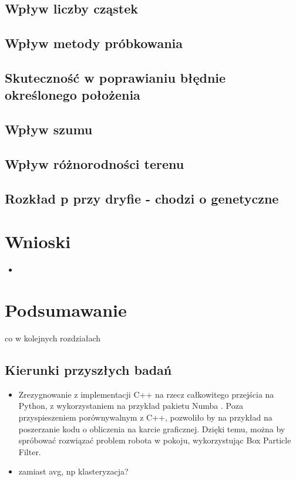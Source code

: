 \documentclass[10pt,a4paper]{article}
\begin{document}
\subsection{Wpływ liczby cząstek}
\subsection{Wpływ metody próbkowania}
\subsection{Skuteczność w poprawianiu błędnie określonego położenia}
\subsection{Wpływ szumu}
\subsection{Wpływ różnorodności terenu}
\subsection{Rozkład p przy dryfie - chodzi o genetyczne}

\section{Wnioski}
\begin{itemize}
	\item 
\end{itemize}
\section{Podsumawanie}
co w kolejnych rozdziałach

\subsection{Kierunki przyszłych badań}
\begin{itemize}
	\item Zrezygnowanie z implementacji C++ na rzecz całkowitego przejścia na Python, z wykorzystaniem na przykład pakietu Numba \cite{numba}. Poza przyspieszeniem porównywalnym z C++, pozwoliło by na przykład na poszerzanie kodu o obliczenia na karcie graficznej. Dzięki temu, można by spróbować rozwiązać problem robota w pokoju, wykorzystując Box Particle Filter.
	\item zamiast avg, np klasteryzacja?
\end{itemize}



\end{document}
